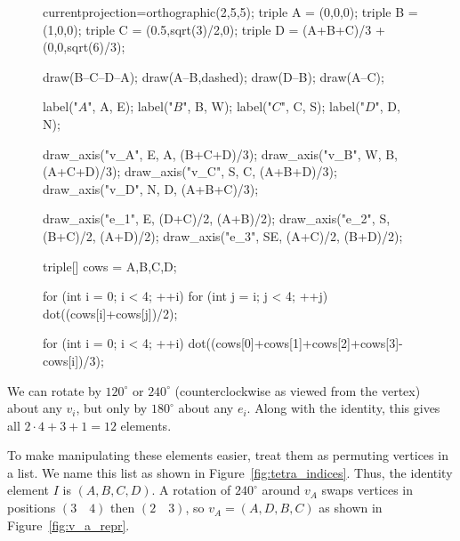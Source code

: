 \documentclass[../key.tex]{subfiles}
\begin{document}
\begin{figure}[h]
	\begin{center}
		\begin{minipage}[b]{\textwidth}
			\centering
			\begin{asy}[width=0.5\textwidth]
			currentprojection=orthographic(2,5,5);
			triple A = (0,0,0);
			triple B = (1,0,0);
			triple C = (0.5,sqrt(3)/2,0);
			triple D = (A+B+C)/3 + (0,0,sqrt(6)/3);
			
			draw(B--C--D--A);
			draw(A--B,dashed);
			draw(D--B);
			draw(A--C);
			
			label("$A$", A, E);
			label("$B$", B, W);
			label("$C$", C, S);
			label("$D$", D, N);
			
			draw_axis("v_A", E, A, (B+C+D)/3);
			draw_axis("v_B", W, B, (A+C+D)/3);
			draw_axis("v_C", S, C, (A+B+D)/3);
			draw_axis("v_D", N, D, (A+B+C)/3);
			
			draw_axis("e_1", E, (D+C)/2, (A+B)/2);
			draw_axis("e_2", S, (B+C)/2, (A+D)/2);
			draw_axis("e_3", SE, (A+C)/2, (B+D)/2);
			
			triple[] cows = {A,B,C,D};
			
			for (int i = 0; i < 4; ++i) {
				for (int j = i; j < 4; ++j) {
					dot((cows[i]+cows[j])/2);
				}
			}
			
			for (int i = 0; i < 4; ++i) {
				dot((cows[0]+cows[1]+cows[2]+cows[3]-cows[i])/3);
			}
			
			\end{asy}
		\end{minipage}
	\end{center}
	\vspace*{-2\baselineskip}
	\begin{center}
		\begin{minipage}[t]{\textwidth}
			\label{fig:tetra_rot_axes}
		\end{minipage}
	\end{center}
	\vspace*{-2\baselineskip}
\end{figure}

\noindent We can rotate by $120^\circ$ or $240^\circ$ (counterclockwise as viewed from the vertex) about any $v_i$, but only by $180^\circ$ about any $e_i$. Along with the identity, this gives all $2\cdot 4+3+1=12$ elements.

To make manipulating these elements easier, treat them as permuting vertices in a list. We name this list as shown in Figure~\ref{fig:tetra_indices}. Thus, the identity element $I$ is $(A,B,C,D)$. A rotation of $240^\circ$ around $v_A$ swaps vertices in positions $(3\quad 4)$ then $(2\quad 3)$, so $v_A=(A,D,B,C)$ as shown in Figure~\ref{fig:v_a_repr}.
\end{document}
